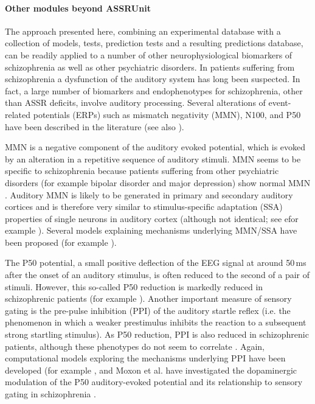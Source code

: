 \documentclass[CompPsych]{stjour}
\begin{document}
\paragraph{Other modules beyond ASSRUnit}
The approach presented here, combining an experimental database with a collection of models, tests, prediction tests and a resulting predictions database, can be readily applied 
to a number of other neurophysiological biomarkers of schizophrenia as well as other psychiatric disorders. 
In patients suffering from schizophrenia a dysfunction of the auditory system has long been suspected. In fact, a large number of biomarkers and endophenotypes for schizophrenia, other
than ASSR deficits, involve auditory processing. Several alterations of event-related potentials (ERPs) such as mismatch negativity (MMN), N100, and P50 have been described in the literature 
(see also \cite{Siekmeier2015,Shi2007}).

MMN is a negative component of the auditory evoked potential, which is evoked by an alteration in a repetitive sequence of auditory stimuli. MMN
seems to be specific to schizophrenia because patients suffering from other psychiatric disorders (for example bipolar disorder and major depression) show normal MMN \cite{Umbricht2003}. 
Auditory MMN is likely to be generated in primary and secondary auditory cortices and is therefore very similar  
to stimulus-specific adaptation (SSA) properties of single neurons in auditory cortex \cite{Nelken2007} (although not identical; see efor example \cite{Farley2010,vonderBehrens2009}).
Several models explaining mechanisms underlying MMN/SSA have been proposed (for example \cite{Mill2011,Nelken2014}).  

The P50 potential, a small positive deflection of the EEG signal at around 50\,ms after the onset of an auditory stimulus, is often reduced to the second of a pair of stimuli.
However, this so-called P50 reduction is markedly reduced in schizophrenic patients (for example \cite{Braff2007}). Another important measure of sensory gating is the pre-pulse inhibition (PPI) of
the auditory startle reflex (i.e. the phenomenon in which a weaker prestimulus inhibits the reaction to a subsequent strong startling stimulus). As P50 reduction, PPI is also reduced in schizophrenic patients,
although these phenotypes do not seem to correlate \cite{Braff2007}. Again, computational models exploring the mechanisms underlying PPI have been developed (for example \cite{Schmajuk2005,Ramirez2012,Leumann2001}, and Moxon et al.
have investigated the dopaminergic modulation of the P50 auditory-evoked potential and its relationship to sensory gating in schizophrenia \cite{Moxon2003}.
 
\end{document}
